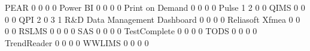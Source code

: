 \documentclass{article}
\begin{document}
\begin{Schunk}
\begin{Soutput}
  PEAR                                        0            0            0    0
  Power BI                                    0            0            0    0
  Print on Demand                             0            0            0    0
  Pulse                                       1            2            0    0
  QIMS                                        0            0            0    0
  QPI                                         2            0            3    1
  R&D Data Management Dashboard               0            0            0    0
  Reliasoft Xfmea                             0            0            0    0
  RSLMS                                       0            0            0    0
  SAS                                         0            0            0    0
  TestComplete                                0            0            0    0
  TODS                                        0            0            0    0
  TrendReader                                 0            0            0    0
  WWLIMS                                      0            0            0    0
                                          

\end{Soutput}
\end{Schunk}
\end{document}
